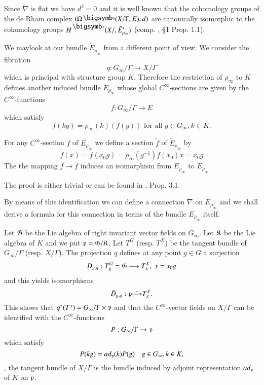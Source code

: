Since $\tilde{\nabla}$ is flat we have $d^2 = 0$ and it is well known that the cohomology groups of the de Rham complex $(\Omega \bigdot (X/ \Gamma, E), d)$ are canonically isomorphic to the cohomology groups $H^\bigdot (X/ {}, \tilde{E}'_{\rho_\infty})$ (comp. \cite{art10-key10}, \S 1 Prop. 1.1).

We may\pageoriginale look at our bundle $\tilde{E}_{\rho_\infty}$ from a different point of view. We consider the fibration
$$
q : G_\infty/ \Gamma \to X / \Gamma
$$
which is principal with structure group $K$. Therefore the restriction of $\rho_\infty$ to $K$ defines another induced bundle $E_{\rho_\infty}$ whose global $C^{\infty}$-sections are given by the $C^\infty$-functions
$$
f: G_\infty / \Gamma \to E
$$
which satisfy
$$
f (kg) = \rho_\infty (k) (f(g)) \text{ for all } g \in G_\infty, k \in K.
$$

\setcounter{lemma}{1}
\begin{lemma}\label{art5-lem1.2}
For any $C^\infty$-section $f$ of $E_{\rho_\infty}$ we define a section $\tilde{f}$ of $\tilde{E}_{\rho_\infty}$ by
$$
\tilde{f} (x) = \tilde{f} (x_0 g) = \rho_\infty (g^{-1}) f(x_0) x = x_0 g
$$
The the mapping $f \to \tilde{f}$ induces an isomorphism from $E_{\rho_\infty}$ to $\tilde{E}_{\rho_\infty}$
\end{lemma}

The proof is either trivial or can be found in \cite{art5-key10}, Prop. 3.1.

By means of this identification we can define a connection $\nabla$ on $E_{\rho_\infty}$ and we shall derive a formula for this connection in terms of the bundle $E_{\rho_\infty}$ itself.

Let $\mathfrak{G}$ be the Lie algebra of right invariant vector fields on $G_\infty$. Let $\mathfrak{K}$ be the Lie algebra of $K$ and we put $\mathfrak{p} = \mathfrak{G}/\mathfrak{K}$. Let $T^G$ (resp. $T^X$) be the tangent bundle of $G_\infty /\Gamma$ (resp. $X/ \Gamma$). The projection $q$ defines at any point $g \in G$ a surjection
$$
D_{g, q} : T^G_g  = \mathfrak{G} \longrightarrow T^X_x, \; x  = x_0 g
$$
and this yields isomorphisms
$$
\bar{D}_{g, q} : \mathfrak{p} \tilde{\longrightarrow} T^X_x.
$$
This shows that $q^\ast (T^x) = G_\infty / \Gamma \times \mathfrak{p}$ and that the $C^\infty$-vector fields on $X/ \Gamma$ can be identified with the $C^\infty$-functions
$$
P : G_\infty / \Gamma \to \mathfrak{p}
$$
which satisfy
\setcounter{equation}{2}
\begin{equation}
P(kg) = ad_{\mathfrak{p}} (k) P(g) \quad g \in G_\infty, k \in K, 
\label{art5-eq1.3}
\end{equation}
\ie, the tangent bundle of $X/ \Gamma$ is the bundle induced by adjoint representation $ad_{\mathfrak{p}}$ of $K$ on $\mathfrak{p}$.

